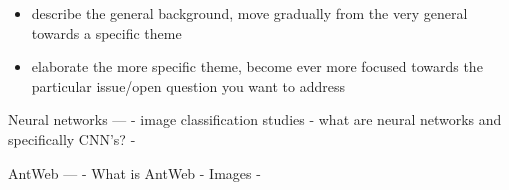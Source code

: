 \begin{itemize}
\item describe the general background, move gradually from the very general towards a specific theme 
\item elaborate the more specific theme, become ever more focused towards the particular issue/open question you want to address 
\end{itemize}

Neural networks
---
- image classification studies
- what are neural networks and specifically CNN's?
- 

AntWeb 
--- 
- What is AntWeb
- Images 
- 